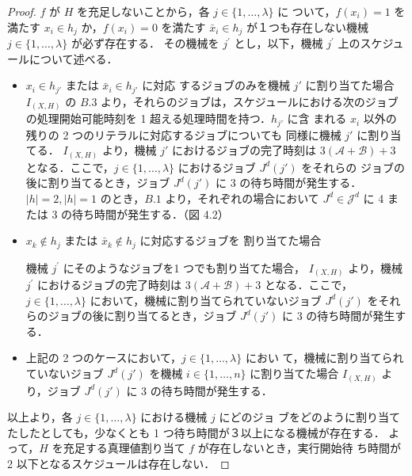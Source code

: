 \documentclass[12pt]{optlab-bachelor}
\begin{document}
\begin{proof}
  $f$ が $H$ を充足しないことから，各 $j \in \{1, \ldots, \lambda \}$ に
  ついて，$f(x_i) = 1$ を満たす $x_i \in h_j$ か，$f(x_i) = 0$ を満たす
  $\bar x_i \in h_j$ が１つも存在しない機械 $j \in \{1,\ldots, \lambda\}$ が必ず存在する．
  その機械を $j^{\prime}$ とし，以下，機械 $j^{\prime}$ 上のスケジュールについて述べる．
  \begin{itemize}
    \item $x_i \in h_{j'}$ または $\bar x_i \in h_{j'}$ に対応
    するジョブのみを機械 $j'$ に割り当てた場合
    $I_{(X,H)}$ の $B.3$ より，それらのジョブは，スケジュールにおける次のジョブの処理開始可能時刻を 1 超える処理時間を持つ．$h_{j'}$ に含
    まれる $x_i$ 以外の残りの 2 つのリテラルに対応するジョブについても
    同様に機械 $j'$ に割り当てる．
    $I_{(X,H)}$ より，機械 $j'$ におけるジョブの完了時刻は
    $3(\mathcal{A} + \mathcal{B}) + 3$ となる．ここで，$j \in
    \{1,\ldots,\lambda\}$ におけるジョブ $J^d(j')$ をそれらの
    ジョブの後に割り当てるとき，ジョブ $J^d(j')$ に 3 の待ち時間が発生する．$|h| = 2,|h| = 1$ のとき，$B.1$ より，それぞれの場合において $J^d \in \mathcal{J}^d$ に 4 または 3 の待ち時間が発生する．（図 4.2）
  \end{itemize}

  \begin{itemize}
    \item $x_k \notin h_j$ または $\bar x_k \notin h_j$ に対応するジョブを
    割り当てた場合

    機械 $j^{\prime}$ にそのようなジョブを1 つでも割り当てた場合，
    $I_{(X,H)}$ より，機械 $j^{\prime}$ におけるジョブの完了時刻は
    $3(\mathcal{A} + \mathcal{B}) + 3$ となる．ここで，$j \in
    \{1,\ldots,\lambda\}$ において，機械に割り当てられていないジョブ
    $J^d(j')$ をそれらのジョブの後に割り当てるとき，ジョブ
    $J^d(j')$ に 3 の待ち時間が発生する．
    \item 上記の 2 つのケースにおいて，$j \in \{1,\ldots,\lambda\}$ におい
    て，機械に割り当てられていないジョブ $J^d(j')$ を機械 $i
    \in \{1,\ldots,n\}$ に割り当てた場合 $I_{(X,H)}$ より，ジョブ
    $J^d(j')$ に 3 の待ち時間が発生する．
  \end{itemize}
  以上より，各 $j \in \{1,\ldots,\lambda\}$ における機械 $j$ にどのジョ
  ブをどのように割り当てたしたとしても，少なくとも 1 つ待ち時間が３以上になる機械が存在する．
  よって，$H$ を充足する真理値割り当て $f$ が存在しないとき，実行開始待
  ち時間が 2 以下となるスケジュールは存在しない．
\end{proof}
\end{document}
